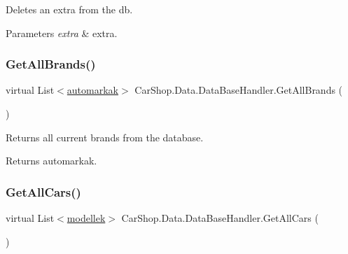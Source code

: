 Deletes an extra from the db. 


\begin{DoxyParams}{Parameters}
{\em extra} & extra.\\
\hline
\end{DoxyParams}
\mbox{\label{class_car_shop_1_1_data_1_1_data_base_handler_a30bf4a331f9a80dde8d5ffbe7c0b2c9d}} 
\subsubsection{\texorpdfstring{Get\+All\+Brands()}{GetAllBrands()}}
{\footnotesize\ttfamily virtual List$<$\mbox{\hyperlink{class_car_shop_1_1_data_1_1automarkak}{automarkak}}$>$ Car\+Shop.\+Data.\+Data\+Base\+Handler.\+Get\+All\+Brands (\begin{DoxyParamCaption}{ }\end{DoxyParamCaption})\hspace{0.3cm}{\ttfamily [virtual]}}



Returns all current brands from the database. 

\begin{DoxyReturn}{Returns}
automarkak.
\end{DoxyReturn}
\mbox{\label{class_car_shop_1_1_data_1_1_data_base_handler_a6ae5db47545f7b328ac0d6425371bf06}} 
\subsubsection{\texorpdfstring{Get\+All\+Cars()}{GetAllCars()}}
{\footnotesize\ttfamily virtual List$<$\mbox{\hyperlink{class_car_shop_1_1_data_1_1modellek}{modellek}}$>$ Car\+Shop.\+Data.\+Data\+Base\+Handler.\+Get\+All\+Cars (\begin{DoxyParamCaption}{ }\end{DoxyParamCaption})\hspace{0.3cm}{\ttfamily [virtual]}}



